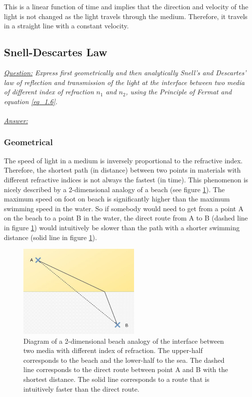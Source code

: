 \documentclass{article}
\begin{document}
This is a linear function of time and implies that the direction and velocity of the light is not changed as the light travels through the medium. Therefore, it travels in a straight line with a constant velocity.\\

\newpage
\subsection{Snell-Descartes Law}

\textit{\underline{Question:} Express first geometrically and then analytically Snell's and Descartes' law of reflection and transmission of the light at the interface between two media of different index of refraction $n_1$ and $n_2$, using the Principle of Fermat and equation \ref{eq_1.6}.}\\
\\
\textit{\underline{Answer:}} \\
\subsubsection{Geometrical}
The speed of light in a medium is inversely proportional to the refractive index. Therefore, the shortest path (in distance) between two points in materials with different refractive indices is not always the fastest (in time). This phenomenon is nicely described by a 2-dimensional analogy of a beach (see figure \ref{fig_snell_empty}). The maximum speed on foot on beach is significantly higher than the maximum swimming speed in the water. So if somebody would need to get from a point A on the beach to a point B in the water, the direct route from A to B (dashed line in figure \ref{fig_snell_empty}) would intuitively be slower than the path with a shorter swimming distance (solid line in figure \ref{fig_snell_empty}).

\begin{figure}[h!]
	\centering
	\includegraphics[width=6cm]{afbeeldingen/snell_diagram_leeg.jpg}
	\caption{Diagram of a 2-dimensional beach analogy of the interface between two media with different index of refraction. The upper-half corresponds to the beach and the lower-half to the sea. The dashed line corresponds to the direct route between point A and B with the shortest distance. The solid line corresponds to a route that is intuitively faster than the direct route.}
	\label{fig_snell_empty}
\end{figure}
\end{document}
